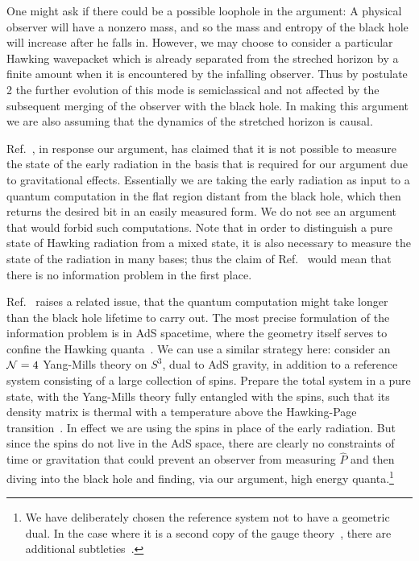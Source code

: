 \documentclass[12pt]{article}
\begin{document}
One might ask if there could be a possible loophole in the argument: A physical observer will have a nonzero mass, and so the mass and entropy of the black hole will increase after he falls in.  However, we may choose to
consider a particular Hawking wavepacket which is already separated from the streched horizon by a finite amount when it is encountered by the infalling observer.  Thus by postulate 2 the further evolution of this mode is semiclassical and not affected by the subsequent merging of the observer with the black hole.  In making this argument we are also assuming that the dynamics of the stretched horizon is causal.

Ref.~\cite{Nomura:2012sw}, in response our argument, has claimed that it is not possible to measure the state of the early radiation in the basis that is required for our argument due to gravitational effects.  Essentially we are taking the early radiation as input to a quantum computation in the flat region distant from the black hole, which then returns the desired bit in an easily measured form.   We do not see an argument that would forbid such computations.
Note that in order to distinguish a pure state of Hawking radiation from a mixed state, it is also necessary to measure the state of the radiation in many bases; thus the claim of Ref.~\cite{Nomura:2012sw} would mean that there is no information problem in the first place.

Ref.~\cite{Suss2} raises a related issue, that the quantum computation might take longer than the black hole lifetime to carry out.  The most precise formulation of the information problem is in AdS spacetime, where the geometry itself serves to confine the Hawking quanta~\cite{Hawking:1982dh,Maldacena:2001kr}.  We can use a similar strategy here: consider an ${\cal N}=4$ Yang-Mills theory on $S^3$, dual to AdS gravity, in addition to a reference system consisting of a large collection of spins.  Prepare the total system in a pure state, with the Yang-Mills theory fully entangled with the spins, such that its density matrix is thermal with a temperature above the Hawking-Page transition~\cite{Hawking:1982dh}.  In effect we are using the spins in place of the early radiation.  {But since the spins do not live in the AdS space, there are clearly no constraints of time or gravitation that could} prevent an observer from measuring $\hat P$ and then diving into the black hole and finding, via our argument, high energy quanta.\footnote{
We have deliberately chosen the reference system not to have a geometric dual.  In the case where it is a second copy of the gauge theory~\cite{Maldacena:2001kr}, there are additional subtleties~\cite{MarWall}.}
\end{document}
